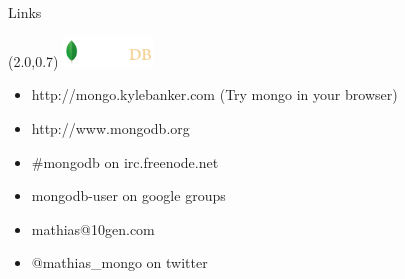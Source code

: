 \documentclass{beamer}
\newcommand{\MongoLogo}{
\begin{textblock}{14}(2.0,0.7)
  \includegraphics[height=0.8cm]{logo-mongodb-ondark.png}
\end{textblock}
}
\begin{document}
\begin{frame}{Links}{}
  \MongoLogo

  \begin{itemize}
    \item http://mongo.kylebanker.com (Try mongo in your browser)
    \item http://www.mongodb.org
    \item \#mongodb on irc.freenode.net
    \item mongodb-user on google groups
  \end{itemize}
  \begin{itemize}
    \item mathias@10gen.com
    \item @mathias\_mongo on twitter
  \end{itemize}
\end{frame}
\end{document}
